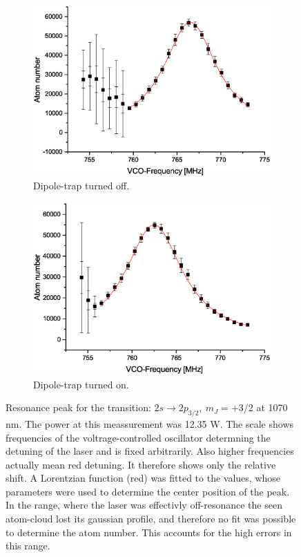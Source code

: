 \begin{figure}[h]
\centering
\begin{subfigure}[b]{0.48\textwidth}
                \includegraphics[width=\textwidth]{withoutodt}
                \caption{Dipole-trap turned off.}
\end{subfigure}
\begin{subfigure}[b]{0.48\textwidth}
               \includegraphics[width=\textwidth]{withodt}
                \caption{Dipole-trap turned on.}
\end{subfigure}


\caption{Resonance peak for the transition: $2s\rightarrow2p_{3/2},\ m_J=$+3/2 at 1070 nm. The power at this meassurement was 12.35 W. The scale shows frequencies of the voltrage-controlled oscillator determning the detuning of the laser and is fixed arbitrarily. Also higher frequencies actually mean red detuning. It therefore shows only the relative shift. A Lorentzian function (red) was fitted to the values, whose parameters were used to determine the center position of the peak. In the range, where the laser was effectivly off-resonance the seen atom-cloud lost its gaussian profile, and therefore no fit was possible to determine the atom number. This accounts for the high errors in this range.}
\label{resonance}
\end{figure}	
